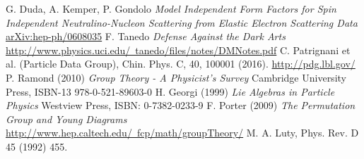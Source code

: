 \begin{thebibliography}{xxx}
 G. Duda, A. Kemper, P. Gondolo \textit{Model Independent Form Factors for Spin Independent Neutralino-Nucleon Scattering from Elastic Electron Scattering Data} \href{https://arxiv.org/abs/hep-ph/0608035v2}{arXiv:hep-ph/0608035}
 F. Tanedo \textit{Defense Against the Dark Arts}\\ \href{http://www.physics.uci.edu/~tanedo/files/notes/DMNotes.pdf}{http://www.physics.uci.edu/~tanedo/files/notes/DMNotes.pdf}
 C. Patrignani et al. (Particle Data Group), Chin. Phys. C, 40, 100001 (2016). \href{http://pdg.lbl.gov/}{http://pdg.lbl.gov/}
 P. Ramond (2010) \textit{Group Theory - A Physicist's Survey} Cambridge University Press, ISBN-13 978-0-521-89603-0 
 H. Georgi (1999) \textit{Lie Algebras in Particle Physics} Westview Press, ISBN: 0-7382-0233-9
 F. Porter (2009) \textit{The Permutation Group and Young Diagrams} \href{http://www.hep.caltech.edu/~fcp/math/groupTheory/}{http://www.hep.caltech.edu/~fcp/math/groupTheory/}
 M. A. Luty, Phys. Rev. D 45 (1992) 455.
\end{thebibliography}